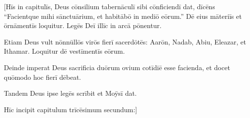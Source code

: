 

\vspace*{-1.4cm}
\thispagestyle{empty}

[Hīs in capitulīs, Deus cōnsilium tabernāculī sibi cōnficiendī dat, 
dīcēns ``Facientque mihi sānctuārium,
et habitābō in mediō eōrum.'' Dē eius māteriīs et ōrnāmentīs loquitur. 
Legēs Deī illīc in arcā pōnentur.

Etiam Deus vult nōnnūllōs virōs fierī sacerdōtēs: Aarōn, Nadab, Abiu, Eleazar, et Ithamar. Loquitur dē vestīmentīs eōrum.

Deinde imperat Deus sacrificia duōrum ovium cotīdiē esse facienda, et docet quōmodo hoc fierī dēbeat.

Tandem Deus ipse legēs scrībit et Moȳsī dat.

Hīc incipit capitulum trīcēsimum secundum:]



